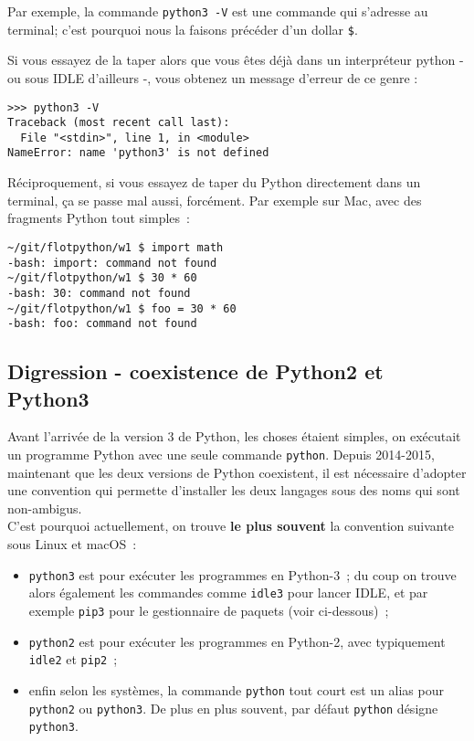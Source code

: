 Par exemple, la commande \texttt{python3\ -V} est une commande qui
s'adresse au terminal; c'est pourquoi nous la faisons précéder d'un
dollar \texttt{\$}.

Si vous essayez de la taper alors que vous êtes déjà dans un
interpréteur python - ou sous IDLE d'ailleurs -, vous obtenez un message
d'erreur de ce genre :

\begin{verbatim}
>>> python3 -V
Traceback (most recent call last):
  File "<stdin>", line 1, in <module>
NameError: name 'python3' is not defined
\end{verbatim}

    Réciproquement, si vous essayez de taper du Python directement dans un
terminal, ça se passe mal aussi, forcément. Par exemple sur Mac, avec
des fragments Python tout simples~:

\begin{verbatim}
~/git/flotpython/w1 $ import math
-bash: import: command not found
~/git/flotpython/w1 $ 30 * 60
-bash: 30: command not found
~/git/flotpython/w1 $ foo = 30 * 60
-bash: foo: command not found
\end{verbatim}

    \hypertarget{digression---coexistence-de-python2-et-python3}{%
\subsection{Digression - coexistence de Python2 et
Python3}\label{digression---coexistence-de-python2-et-python3}}

    Avant l'arrivée de la version 3 de Python, les choses étaient simples,
on exécutait un programme Python avec une seule commande
\texttt{python}. Depuis 2014-2015, maintenant que les deux versions de
Python coexistent, il est nécessaire d'adopter une convention qui
permette d'installer les deux langages sous des noms qui sont
non-ambigus.\\

C'est pourquoi actuellement, on trouve \textbf{le plus souvent} la
convention suivante sous Linux et macOS~:

\begin{itemize}
\item
  \texttt{python3} est pour exécuter les programmes en Python-3~; du
  coup on trouve alors également les commandes comme \texttt{idle3} pour
  lancer IDLE, et par exemple \texttt{pip3} pour le gestionnaire de
  paquets (voir ci-dessous)~;
\item
  \texttt{python2} est pour exécuter les programmes en Python-2, avec
  typiquement \texttt{idle2} et \texttt{pip2}~;
\item
  enfin selon les systèmes, la commande \texttt{python} tout court est
  un alias pour \texttt{python2} ou \texttt{python3}. De plus en plus
  souvent, par défaut \texttt{python} désigne \texttt{python3}.
\end{itemize}

